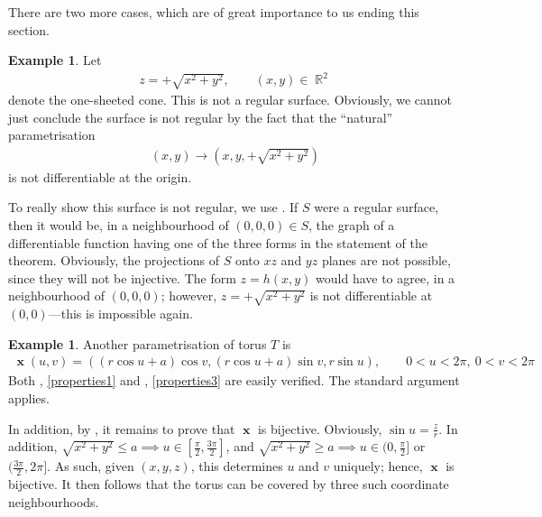 \documentclass{amsart} %
\theoremstyle{mytheoremstyle}
\theoremstyle{definition}
\newtheorem{example}[definition]{Example}
\numberwithin{equation}{section}
\DeclareMathOperator{\R}{\mathbb{R}}
\DeclareMathOperator{\1}{\mathbbm{1}}
\DeclareMathOperator{\x}{\mathbf{x}}
\renewcommand{\leq}{\leqslant}
\renewcommand{\geq}{\geqslant}
\renewcommand{\leq}{\leqslant}
\renewcommand{\geq}{\geqslant}
\begin{document}
There are two more cases, which are of great importance to us ending this section. 

\begin{example}
	\label{exampleonesheetedcone}
	Let
	\begin{align}
	\label{eqonesheetedcone}
	z = + \sqrt{x^2 + y^2}, \qquad (x,y) \in \R^2
	\end{align}
	denote the one-sheeted cone. This is not a regular surface. Obviously, we cannot just conclude the surface is not regular by the fact that the ``natural'' parametrisation
	\begin{align*}
	(x,y) \to (x,y,+ \sqrt{x^2 + y^2})
	\end{align*}
	is not differentiable at the origin.
	
	To really show this surface is not regular, we use . If $S$ were a regular surface, then it would be, in a neighbourhood of $(0,0,0) \in S$, the graph of a differentiable function having one of the three forms in the statement of the theorem. Obviously, the projections of $S$ onto $xz$ and $yz$ planes are not possible, since they will not be injective. The form $z=h(x,y)$ would have to agree, in a neighbourhood of $(0,0,0)$; however, $z=+\sqrt{x^2+y^2}$ is not differentiable at $(0,0)$---this is impossible again.
\end{example}


\begin{example}
	\label{exampletorus2}
	Another parametrisation of torus $T$ is
	\begin{align}
	\label{eqtorus2}
		\x(u,v) = ( (r \cos u + a) \cos v , (r \cos u + a) \sin v , r \sin u  ), \qquad 0 < u < 2\pi, \: 0 < v < 2\pi
	\end{align}
	Both , \eqref{properties1} and , \eqref{properties3} are easily verified. The standard argument applies.
	
	In addition, by , it remains to prove that $\x$ is bijective. Obviously, $\sin u = \frac{z}{r}$. In addition, $\sqrt{x^2 + y^2} \leq a \implies u \in [\frac{\pi}{2},\frac{3\pi}{2}]$, and $\sqrt{x^2 + y^2} \geq a \implies u \in (0,\frac{\pi}{2}]$ or $(\frac{3\pi}{2},2\pi]$. As such, given $(x,y,z)$, this determines $u$ and $v$ uniquely; hence, $\x$ is bijective. It then follows that the torus can be covered by three such coordinate neighbourhoods.
\end{example}
\end{document}
